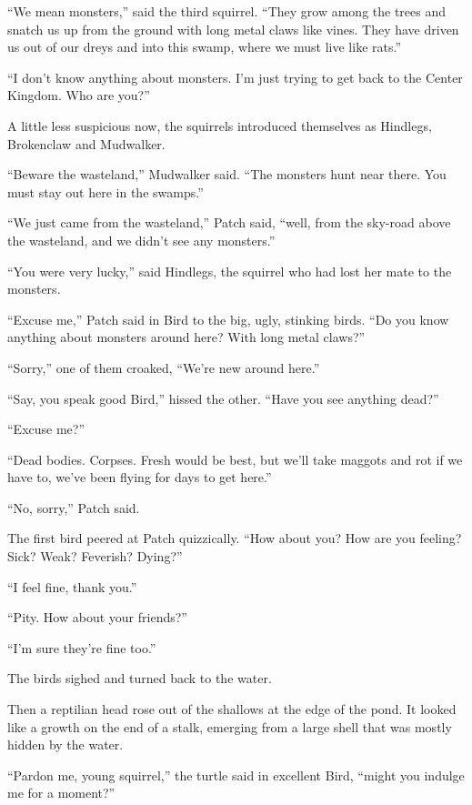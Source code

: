 \documentclass[ebook,oneside,openany,17pt]{memoir}
\newenvironment{tolerant}[1]{%
  \par\tolerance=#1\relax
}{%
  \par
}
\begin{document}
\begin{tolerant}{2000}
“We mean monsters,” said the third squirrel. “They grow among the
trees and snatch us up from the ground with long metal claws like
vines. They have driven us out of our dreys and into this swamp, where
we must live like rats.”
\end{tolerant}

“I don’t know anything about monsters. I’m just trying to get back to
the Center Kingdom. Who are you?”

A little less suspicious now, the squirrels introduced themselves as
Hindlegs, Brokenclaw and Mudwalker.

“Beware the wasteland,” Mudwalker said. “The monsters hunt near
there. You must stay out here in the swamps.”

“We just came from the wasteland,” Patch said, “well, from the
sky-road above the wasteland, and we didn’t see any monsters.”

“You were very lucky,” said Hindlegs, the squirrel who had lost her
mate to the monsters.

“Excuse me,” Patch said in Bird to the big, ugly, stinking birds. “Do
you know anything about monsters around here? With long metal claws?”

“Sorry,” one of them croaked, “We’re new around here.”

“Say, you speak good Bird,” hissed the other. “Have you see anything
dead?”

“Excuse me?”

“Dead bodies. Corpses. Fresh would be best, but we’ll take maggots and
rot if we have to, we’ve been flying for days to get here.”

“No, sorry,” Patch said.

The first bird peered at Patch quizzically. “How about you? How are
you feeling? Sick? Weak? Feverish? Dying?”

“I feel fine, thank you.”

“Pity. How about your friends?”

“I’m sure they’re fine too.”

The birds sighed and turned back to the water.

Then a reptilian head rose out of the shallows at the edge of the
pond. It looked like a growth on the end of a stalk, emerging from a
large shell that was mostly hidden by the water.

“Pardon me, young squirrel,” the turtle said in excellent Bird, “might
you indulge me for a moment?”
\end{document}
